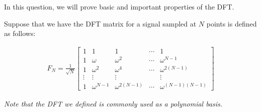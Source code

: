 

In this question, we will prove basic and important properties of the DFT.

Suppose that we have the DFT matrix for a signal sampled at $N$ points is defined as follows:

\begin{align*}
F_N =
  \frac{1}{\sqrt{N}} \begin{bmatrix}
  1 & 1 & 1 & \cdots  & 1 \\
  1 & \omega & \omega^2 & \cdots & \omega^{N-1} \\
  1 & \omega^2 & \omega^4  & \cdots &  \omega^{2(N-1)}\\
  \vdots & \vdots & \vdots & & \vdots \\
  1 & \omega^{N-1} & \omega^{2(N-1)}  & \cdots  & \omega^{(N-1)(N-1)}
  \end{bmatrix}
\end{align*}

{\em Note that the DFT we defined is commonly used as a polynomial basis.}


